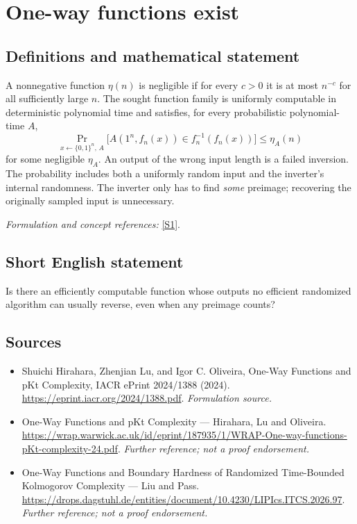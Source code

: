 \documentclass[11pt]{article}
\begin{document}
\section*{\texorpdfstring{One-way functions exist}{One-way functions exist}}\label{3403}
\subsection{Definitions and mathematical statement}
A nonnegative function $\eta(n)$ is negligible if for every $c>0$ it is at most $n^{-c}$ for all sufficiently large $n$. The sought function family is uniformly computable in deterministic polynomial time and satisfies, for every probabilistic polynomial-time $A$,
\[
 \Pr_{x\leftarrow\{0,1\}^n,\,A}\!\bigl[A(1^n,f_n(x))\in f_n^{-1}(f_n(x))\bigr]
 \le \eta_A(n)
\]
for some negligible $\eta_A$. An output of the wrong input length is a failed inversion. The probability includes both a uniformly random input and the inverter's internal randomness. The inverter only has to find \emph{some} preimage; recovering the originally sampled input is unnecessary.
\par\smallskip\textit{Formulation and concept references:} \href{https://eprint.iacr.org/2024/1388.pdf}{[S1]}.

\subsection{Short English statement}
Is there an efficiently computable function whose outputs no efficient randomized algorithm can usually reverse, even when any preimage counts?
\subsection{Sources}
\begin{itemize}
\item[S1]Shuichi Hirahara, Zhenjian Lu, and Igor C. Oliveira, One-Way Functions and pKt Complexity, IACR ePrint 2024/1388 (2024).
\url{https://eprint.iacr.org/2024/1388.pdf}.
\textit{Formulation source.}
\item[S2]One-Way Functions and pKt Complexity — Hirahara, Lu and Oliveira.
\url{https://wrap.warwick.ac.uk/id/eprint/187935/1/WRAP-One-way-functions-pKt-complexity-24.pdf}.
\textit{Further reference; not a proof endorsement.}
\item[S3]One-Way Functions and Boundary Hardness of Randomized Time-Bounded Kolmogorov Complexity — Liu and Pass.
\url{https://drops.dagstuhl.de/entities/document/10.4230/LIPIcs.ITCS.2026.97}.
\textit{Further reference; not a proof endorsement.}
\end{itemize}
\end{document}
